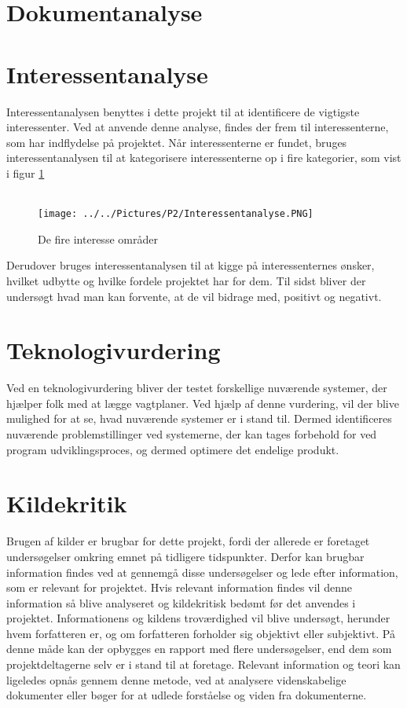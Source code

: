 \documentclass[11pt, twoside, a4paper, openright]{report}
\begin{document}
	\section{Dokumentanalyse}
	
	\section{Interessentanalyse}
	Interessentanalysen benyttes i dette projekt til at identificere de vigtigste interessenter. Ved at anvende denne analyse, findes der frem til interessenterne, som har indflydelse på projektet. Når interessenterne er fundet, bruges interessentanalysen til at kategorisere interessenterne op i fire kategorier, som vist i figur \ref{fig:interesser} 
	\\\\
	\begin{figure}[h]
\centering
\texttt{[image: ../../Pictures/P2/Interessentanalyse.PNG]}
\caption{De fire interesse områder}\label{fig:interesser}
	\end{figure}
	
	Derudover bruges interessentanalysen til at kigge på interessenternes ønsker, hvilket udbytte og hvilke fordele projektet har for dem. Til sidst bliver der undersøgt hvad man kan forvente, at de vil bidrage med, positivt og negativt.
	
	\section{Teknologivurdering}
	Ved en teknologivurdering bliver der testet forskellige nuværende systemer, der hjælper folk med at lægge vagtplaner. Ved hjælp af denne vurdering, vil der blive mulighed for at se, hvad nuværende systemer er i stand til. Dermed identificeres nuværende problemstillinger ved systemerne, der kan tages forbehold for ved program udviklingsproces, og dermed optimere det endelige produkt.
	
	\section{Kildekritik}
	Brugen af kilder er brugbar for dette projekt, fordi der allerede er foretaget undersøgelser omkring emnet på tidligere tidspunkter. Derfor kan brugbar information findes ved at gennemgå disse undersøgelser og lede efter information, som er relevant for projektet. Hvis relevant information findes vil denne information så blive analyseret og kildekritisk bedømt før det anvendes i projektet. Informationens og kildens troværdighed vil blive undersøgt, herunder hvem forfatteren er, og om forfatteren forholder sig objektivt eller subjektivt. På denne måde kan der opbygges en rapport med flere undersøgelser, end dem som projektdeltagerne selv er i stand til at foretage. Relevant information og teori kan ligeledes opnås gennem denne metode, ved at analysere videnskabelige dokumenter eller bøger for at udlede forståelse og viden fra dokumenterne. 
	
\end{document}
